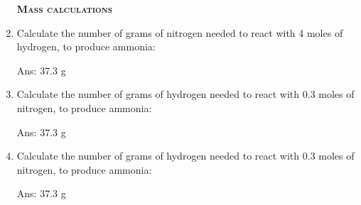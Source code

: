 \documentclass[main.tex]{subfiles}
\begin{document}
\begin{multicols*}{2}
\begin{enumerate}
{\raggedright\textsc{\textbf{Mass calculations}}\par}

\item Calculate the number of grams of nitrogen needed to react with 4 moles of hydrogen, to produce ammonia:
\begin{center}  \end{center}
\begin{flushright}\small Ans: 37.3 g\end{flushright}


\item Calculate the number of grams of hydrogen needed to react with 0.3 moles of nitrogen, to produce ammonia:
\begin{center}  \end{center}
\begin{flushright}\small Ans: 37.3 g\end{flushright}


\item Calculate the number of grams of hydrogen needed to react with 0.3 moles of nitrogen, to produce ammonia:
\begin{center}  \end{center}
\begin{flushright}\small Ans: 37.3 g\end{flushright}

\restoregeometry
\end{enumerate}
\end{multicols*}
\pagecolor{green!10}\afterpage{\nopagecolor}\newpage
\end{document}

